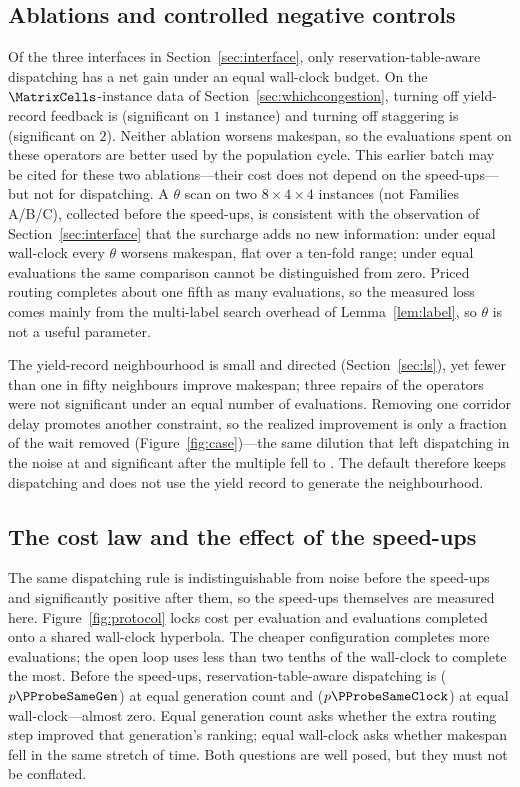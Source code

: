 \subsection{Ablations and controlled negative controls}
\label{sec:pricing}

Of the three interfaces in Section~\ref{sec:interface}, only reservation-table-aware dispatching has a net gain under an equal wall-clock budget.
On the $\MatrixCells$-instance data of Section~\ref{sec:whichcongestion}, turning off yield-record feedback is \GainCertMatrix{} (significant on $1$ instance) and turning off staggering is \GainStaggerMatrix{} (significant on $2$).
Neither ablation worsens makespan, so the evaluations spent on these operators are better used by the population cycle.
This earlier batch may be cited for these two ablations---their cost does not depend on the speed-ups---but not for dispatching.
A $\theta$ scan on two $8\times4\times4$ instances (not Families A/B/C), collected before the speed-ups, is consistent with the observation of Section~\ref{sec:interface} that the surcharge adds no new information: under equal wall-clock every $\theta$ worsens makespan, flat over a ten-fold range; under equal evaluations the same comparison cannot be distinguished from zero.
Priced routing completes about one fifth as many evaluations, so the measured loss comes mainly from the multi-label search overhead of Lemma~\ref{lem:label}, so $\theta$ is not a useful parameter.

\label{sec:whycost}
The yield-record neighbourhood is small and directed (Section~\ref{sec:ls}), yet fewer than one in fifty neighbours improve makespan; three repairs of the operators were not significant under an equal number of evaluations.
Removing one corridor delay promotes another constraint, so the realized improvement is only a fraction of the wait removed (Figure~\ref{fig:case})---the same dilution that left dispatching in the noise at \CostMultBefore{} and significant after the multiple fell to \CostMultAfter{}.
The default therefore keeps dispatching and does not use the yield record to generate the neighbourhood.


\subsection{The cost law and the effect of the speed-ups}
\label{sec:costlaw}

The same dispatching rule is indistinguishable from noise before the speed-ups and significantly positive after them, so the speed-ups themselves are measured here.
Figure~\ref{fig:protocol} locks cost per evaluation and evaluations completed onto a shared wall-clock hyperbola.
The cheaper configuration completes more evaluations; the open loop uses less than two tenths of the wall-clock to complete the most.
Before the speed-ups, reservation-table-aware dispatching is \GainProbeSameGen{} ($p\PProbeSameGen$) at equal generation count and \GainProbeSameClock{} ($p\PProbeSameClock$) at equal wall-clock---almost zero.
Equal generation count asks whether the extra routing step improved that generation's ranking; equal wall-clock asks whether makespan fell in the same stretch of time.
Both questions are well posed, but they must not be conflated.

